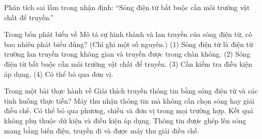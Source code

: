 \begin{bt}
Phân tích sai lầm trong nhận định: “Sóng điện từ bắt buộc cần môi trường vật chất để truyền.”
\end{bt}

\begin{ex}
Trong bốn phát biểu về Mô tả sự hình thành và lan truyền của sóng điện từ, có bao nhiêu phát biểu đúng? (Chỉ ghi một số nguyên.) (1) Sóng điện từ là điện từ trường lan truyền trong không gian và truyền được trong chân không. (2) Sóng điện từ bắt buộc cần môi trường vật chất để truyền. (3) Cần kiểm tra điều kiện áp dụng. (4) Có thể bỏ qua đơn vị.
\end{ex}

\begin{ex}
Trong một bài thực hành về Giải thích truyền thông tin bằng sóng điện từ và các tình huống thực tiễn?
\choice
{Máy thu nhận thông tin mà không cần chọn sóng hay giải điều chế.}
{Có thể bỏ qua phương, chiều và đơn vị trong mọi trường hợp.}
{Kết quả không phụ thuộc dữ kiện và điều kiện áp dụng.}
{\True Thông tin được ghép lên sóng mang bằng biến điệu, truyền đi và được máy thu giải điều chế.}
\end{ex}

